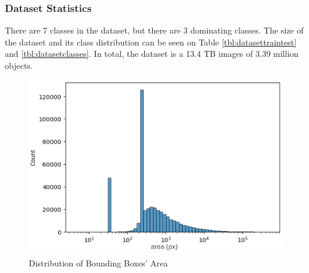   \subsubsection{Dataset Statistics}
  There are 7 classes in the dataset, but there are 3 dominating classes.
  The size of the dataset and its class distribution can be seen on Table \ref{tbl:datasettraintest} and
  \ref{tbl:datasetclasses}. In total, the dataset is a 13.4 TB images of 3.39 million objects.
  \begin{table}
    \centering
    \label{tbl:datasettraintest}
    
  \end{table}
  \begin{table}
    \centering
    \label{tbl:datasetclasses}
    
  \end{table}

  \begin{figure}
    \centering
    \includegraphics[width=.8\textwidth]{figures/area-dist.png}
    \caption{Distribution of Bounding Boxes' Area}
    \label{fig:areadist}
  \end{figure}


